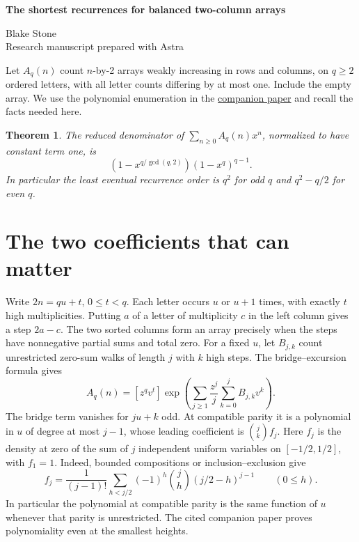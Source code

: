 \documentclass[11pt,letterpaper]{article}
\newtheorem{theorem}{Theorem}
\begin{document}
\thispagestyle{plain}
\begin{center}
{\LARGE\bfseries The shortest recurrences for balanced two-column arrays\par}
\vspace{0.5em}
Blake Stone\\
{\small Research manuscript prepared with Astra}
\end{center}

\begin{abstract}
For an ordered alphabet of even size \(q\), the exact reduced denominator of the generating function of balanced, weakly increasing two-column arrays is \((1-x^{q/2})(1-x^q)^{q-1}\). Together with the odd-alphabet formula this gives the shortest eventual constant-coefficient recurrence at every alphabet size. The extra poles at the even moduli are detected by two odd-length bridges.
\end{abstract}

Let \(A_q(n)\) count \(n\)-by-2 arrays weakly increasing in rows and columns, on \(q\ge2\) ordered letters, with all letter counts differing by at most one. Include the empty array. We use the polynomial enumeration in the \href{https://github.com/blakestone-x/math/blob/c92ab48c98acba51cb42ceb73536a7bad251ec2d/A200984/balanced-arrays.pdf}{companion paper} and recall the facts needed here.
\begin{theorem}\label{th:den}
The reduced denominator of \(\sum_{n\ge0} A_q(n)x^n\), normalized to have constant term one, is
\[
               (1-x^{q/\gcd(q,2)})(1-x^q)^{q-1}.
\]
In particular the least eventual recurrence order is \(q^2\) for odd \(q\) and \(q^2-q/2\) for even \(q\).
\end{theorem}

\section{The two coefficients that can matter}
Write \(2n=qu+t\), \(0\le t<q\). Each letter occurs \(u\) or \(u+1\) times, with exactly \(t\) high multiplicities. Putting \(a\) of a letter of multiplicity \(c\) in the left column gives a step \(2a-c\). The two sorted columns form an array precisely when the steps have nonnegative partial sums and total zero. For a fixed \(u\), let \(B_{j,k}\) count unrestricted zero-sum walks of length \(j\) with \(k\) high steps. The bridge--excursion formula gives
\[
 A_q(n)=[z^q v^t]\exp\left(\sum_{j\ge1}\frac{z^j}{j}
                          \sum_{k=0}^j B_{j,k}v^k\right).
\]
The bridge term vanishes for \(ju+k\) odd. At compatible parity it is a polynomial in \(u\) of degree at most \(j-1\), whose leading coefficient is \(\binom jk f_j\). Here \(f_j\) is the density at zero of the sum of \(j\) independent uniform variables on \([-1/2,1/2]\), with \(f_1=1\). Indeed, bounded compositions or inclusion--exclusion give
\[
 f_j=\frac{1}{(j-1)!}\sum_{h<j/2}(-1)^h\binom jh(j/2-h)^{j-1}\qquad(0\le h).
\]
In particular the polynomial at compatible parity is the same function of \(u\) whenever that parity is unrestricted. The cited companion paper proves polynomiality even at the smallest heights.
\end{document}
